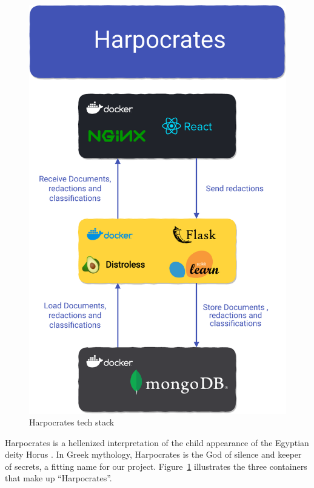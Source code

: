 \documentclass[\version]{l4proj}
\begin{document}
\begin{figure}
    \includegraphics[width=\linewidth]{figures/tech_stack_no_background.pdf}
    \caption{Harpocrates tech stack}\label{fig:tech_stack}
    \vspace{-50pt}
\end{figure}

Harpocrates is a hellenized interpretation of the child appearance of the Egyptian deity Horus \autocite{mattheyChutSigneHarpocrate2011}.
In Greek mythology, Harpocrates is the God of silence and keeper of secrets, a fitting name for our project.
Figure~\ref{fig:tech_stack} illustrates the three containers that make up ``Harpocrates''.
\end{document}
